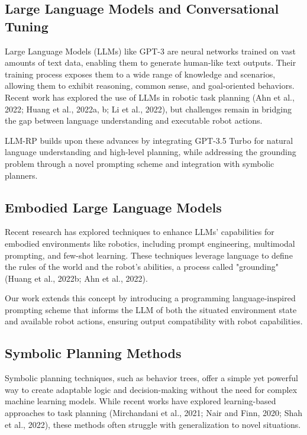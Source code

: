 \documentclass[pdflatex,sn-mathphys-num]{sn-jnl}%
\theoremstyle{thmstyleone}%
\theoremstyle{thmstyletwo}%
\theoremstyle{thmstylethree}%
\begin{document}
\subsection{Large Language Models and Conversational Tuning}

Large Language Models (LLMs) like GPT-3 are neural networks trained on vast amounts of text data, enabling them to generate human-like text outputs. Their training process exposes them to a wide range of knowledge and scenarios, allowing them to exhibit reasoning, common sense, and goal-oriented behaviors. Recent work has explored the use of LLMs in robotic task planning (Ahn et al., 2022; Huang et al., 2022a, b; Li et al., 2022), but challenges remain in bridging the gap between language understanding and executable robot actions.

LLM-RP builds upon these advances by integrating GPT-3.5 Turbo for natural language understanding and high-level planning, while addressing the grounding problem through a novel prompting scheme and integration with symbolic planners.

\subsection{Embodied Large Language Models}

Recent research has explored techniques to enhance LLMs' capabilities for embodied environments like robotics, including prompt engineering, multimodal prompting, and few-shot learning. These techniques leverage language to define the rules of the world and the robot's abilities, a process called "grounding" (Huang et al., 2022b; Ahn et al., 2022).

Our work extends this concept by introducing a programming language-inspired prompting scheme that informs the LLM of both the situated environment state and available robot actions, ensuring output compatibility with robot capabilities.

\subsection{Symbolic Planning Methods}

Symbolic planning techniques, such as behavior trees, offer a simple yet powerful way to create adaptable logic and decision-making without the need for complex machine learning models. While recent works have explored learning-based approaches to task planning (Mirchandani et al., 2021; Nair and Finn, 2020; Shah et al., 2022), these methods often struggle with generalization to novel situations.
\end{document}
